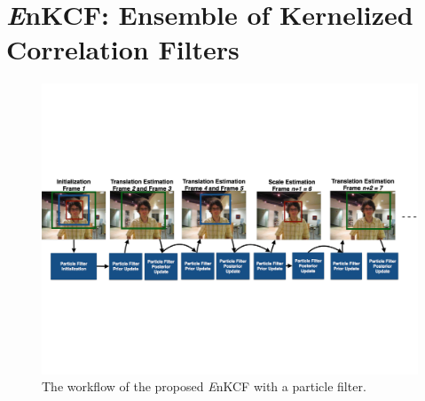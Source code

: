 \documentclass{bmvc2k}
\begin{document}
\begin{itemize}

\end{itemize}

\section{{\it E}nKCF: Ensemble of Kernelized Correlation Filters}
\begin{figure}[!t]
\includegraphics[width=\textwidth]{figures/Workflow_MKCF+PF.pdf}
\caption{The workflow of the proposed {\it E}nKCF with a particle filter.}
\label{Workflow_figure_EnKCF}
\end{figure}
\end{document}
